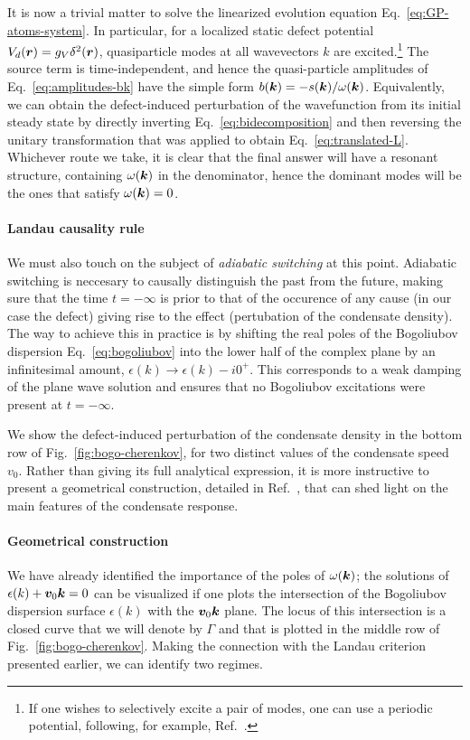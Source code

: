 It is now a trivial matter to solve the linearized evolution equation
Eq.~\eqref{eq:GP-atoms-system}. In particular, for a localized static
defect potential $V_d(\bm{r}) = g_V \delta^2(\bm{r})$, quasiparticle modes
at all wavevectors $k$ are excited.\footnote{If one wishes to
  selectively excite a pair of modes, one can use a periodic
  potential, following, for example, Ref.~\cite{Ianeselli_2006}.} The
source term is time-independent, and hence the quasi-particle
amplitudes of Eq.~\eqref{eq:amplitudes-bk} have the simple form
$b(\bm{k}) = -s(\bm{k})/\omega(\bm{k})$. Equivalently, we can obtain the
defect-induced perturbation of the wavefunction from its initial
steady state by directly inverting Eq.~\eqref{eq:bidecomposition} and
then reversing the unitary transformation that was applied to obtain
Eq.~\eqref{eq:translated-L}. Whichever route we take, it is clear that
the final answer will have a resonant structure, containing
$\omega(\bm{k})$ in the denominator, hence the dominant modes will be the
ones that satisfy $\omega(\bm{k}) = 0$.

\paragraph{Landau causality rule}
We must also touch on the subject of \textit{adiabatic switching} at
this point. Adiabatic switching is neccesary to causally distinguish
the past from the future, making sure that the time $t = -\infty$ is
prior to that of the occurence of any cause (in our case the defect)
giving rise to the effect (pertubation of the condensate density). The
way to achieve this in practice is by shifting the real poles of the
Bogoliubov dispersion Eq.~\eqref{eq:bogoliubov} into the lower half of
the complex plane by an infinitesimal amount,
$\epsilon(k) \rightarrow \epsilon(k) - i0^{+}$. This corresponds to a
weak damping of the plane wave solution and ensures that no Bogoliubov
excitations were present at $t = - \infty$.

We show the defect-induced perturbation of the condensate density in
the bottom row of Fig.~\ref{fig:bogo-cherenkov}, for two distinct
values of the condensate speed $v_0$. Rather than giving its full
analytical expression, it is more instructive to present a geometrical
construction, detailed in Ref.~\cite{9783319002651}, that can shed
light on the main features of the condensate response. 

\paragraph{Geometrical construction}
We have already identified the importance of the poles of
$\omega(\bm{k})$; the solutions of $\epsilon(k) + \bm{v}_0 \bm{k} = 0$ can
be visualized if one plots the intersection of the Bogoliubov
dispersion surface $\epsilon(k)$ with the $\bm{v}_0 \bm{k}$ plane. The
locus of this intersection is a closed curve that we will denote by
$\Gamma$ and that is plotted in the middle row of
Fig.~\ref{fig:bogo-cherenkov}. Making the connection with the Landau
criterion presented earlier, we can identify two regimes. 

